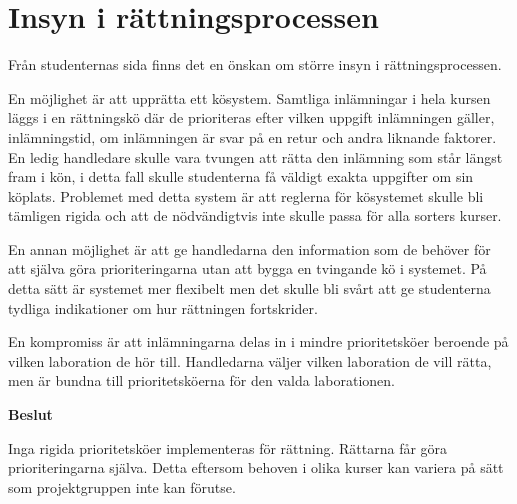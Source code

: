 \section{Insyn i rättningsprocessen}

Från studenternas sida finns det en önskan om större insyn i rättningsprocessen.

En möjlighet är att upprätta ett kösystem. Samtliga inlämningar i hela kursen läggs i en rättningskö där de prioriteras efter vilken uppgift inlämningen gäller, inlämningstid, om inlämningen är svar på en retur och andra liknande faktorer. En ledig handledare skulle vara tvungen att rätta den inlämning som står längst fram i kön, i detta fall skulle studenterna få väldigt exakta uppgifter om sin köplats. Problemet med detta system är att reglerna för kösystemet skulle bli tämligen rigida och att de nödvändigtvis inte skulle passa för alla sorters kurser.

En annan möjlighet är att ge handledarna den information som de behöver för att själva göra prioriteringarna utan att bygga en tvingande kö i systemet. På detta sätt är systemet mer flexibelt men det skulle bli svårt att ge studenterna tydliga indikationer om hur rättningen fortskrider.

En kompromiss är att inlämningarna delas in i mindre prioritetsköer beroende på vilken laboration de hör till. Handledarna väljer vilken laboration de vill rätta, men är bundna till prioritetsköerna för den valda laborationen. 

\begin{flushright}

  \textbf{Beslut}

  Inga rigida prioritetsköer implementeras för rättning. Rättarna får göra prioriteringarna själva. Detta eftersom behoven i olika kurser kan variera på sätt som projektgruppen inte kan förutse.
\end{flushright}
